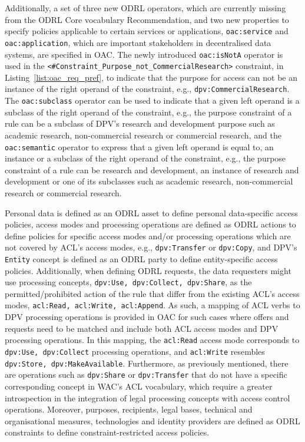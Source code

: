 Additionally, a set of three new ODRL operators, which are currently missing from the ODRL Core vocabulary Recommendation, and two new properties to specify policies applicable to certain services or applications, \texttt{oac:service} and \texttt{oac:application}, which are important stakeholders in decentralised data systems, are specified in OAC.
The newly introduced \texttt{oac:isNotA} operator is used in the \texttt{<\#Constraint\_Purpose\_not\_CommercialResearch>} constraint, in Listing~\ref{list:oac_req_pref}, to indicate that the purpose for access can not be an instance of the right operand of the constraint, e.g., \texttt{dpv:CommercialResearch}.
The \texttt{oac:subclass} operator can be used to indicate that a given left operand is a subclass of the right operand of the constraint, e.g., the purpose constraint of a rule can be a subclass of DPV's research and development purpose such as academic research, non-commercial research or commercial research, and the \texttt{oac:semantic} operator to express that a given left operand is equal to, an instance or a subclass of the right operand of the constraint, e.g., the purpose constraint of a rule can be research and development, an instance of research and development or one of its subclasses such as academic research, non-commercial research or commercial research.

Personal data is defined as an ODRL asset to define personal data-specific access policies, access modes and processing operations are defined as ODRL actions to define policies for specific access modes and/or processing operations which are not covered by ACL's access modes, e.g., \texttt{dpv:Transfer} or \texttt{dpv:Copy}, and DPV's \texttt{Entity} concept is defined as an ODRL party to define entity-specific access policies.
Additionally, when defining ODRL requests, the data requesters might use processing concepts, \texttt{dpv:Use, dpv:Collect, dpv:Share}, as the permitted/prohibited action of the rule that differ from the existing ACL's access modes, \texttt{acl:Read, acl:Write, acl:Append}.
As such, a mapping of ACL verbs to DPV processing operations is provided in OAC for such cases where offers and requests need to be matched and include both ACL access modes and DPV processing operations.
In this mapping, the \texttt{acl:Read} access mode corresponds to \texttt{dpv:Use, dpv:Collect} processing operations, and \texttt{acl:Write} resembles \texttt{dpv:Store, dpv:MakeAvailable}.
Furthermore, as previously mentioned, there are operations such as \texttt{dpv:Share} or \texttt{dpv:Transfer} that do not have a specific corresponding concept in WAC's ACL vocabulary, which require a greater introspection in the integration of legal processing concepts with access control operations.
Moreover, purposes, recipients, legal bases, technical and organisational measures, technologies and identity providers are defined as ODRL constraints to define constraint-restricted access policies.

